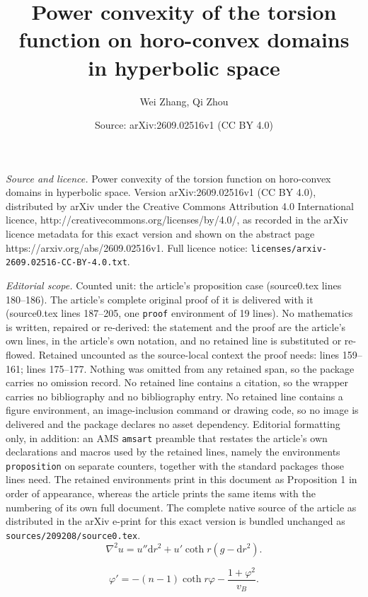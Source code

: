 \documentclass[10pt,a4paper]{amsart}
\title{Power convexity of the torsion function on horo-convex domains in hyperbolic space}
\author{Wei Zhang, Qi Zhou}
\date{Source: arXiv:2609.02516v1 (CC BY 4.0)}
\newcommand{\dd}{\mathrm{d}}
\begin{document}
\maketitle

\noindent\emph{Source and licence.} Power convexity of the torsion function on horo-convex domains in hyperbolic space. Version arXiv:2609.02516v1 (CC BY 4.0), distributed by arXiv under the Creative Commons Attribution 4.0 International licence, http://creativecommons.org/licenses/by/4.0/, as recorded in the arXiv licence metadata for this exact version and shown on the abstract page https://arxiv.org/abs/2609.02516v1. Full licence notice: \texttt{licenses/arxiv-2609.02516-CC-BY-4.0.txt}.\par\smallskip

\noindent\textit{Editorial scope.} Counted unit: the article's proposition case (source0.tex lines 180--186). The article's complete original proof of it is delivered with it (source0.tex lines 187--205, one \texttt{proof} environment of 19 lines). No mathematics is written, repaired or re-derived: the statement and the proof are the article's own lines, in the article's own notation, and no retained line is substituted or re-flowed.  Retained uncounted as the source-local context the proof needs: lines 159--161; lines 175--177.  Nothing was omitted from any retained span, so the package carries no omission record.  No retained line contains a citation, so the wrapper carries no bibliography and no bibliography entry.  No retained line contains a figure environment, an image-inclusion command or drawing code, so no image is delivered and the package declares no asset dependency.  Editorial formatting only, in addition: an AMS \texttt{amsart} preamble that restates the article's own declarations and macros used by the retained lines, namely the environments \texttt{proposition} on separate counters, together with the standard packages those lines need.  The retained environments print in this document as Proposition 1 in order of appearance, whereas the article prints the same items with the numbering of its own full document.  The complete native source of the article as distributed in the arXiv e-print for this exact version is bundled unchanged as \texttt{sources/209208/source0.tex}.
\begin{equation}\label{Equality-radial Hessian}
\nabla^2u=u''\dd r^2+u'\coth r(g-\dd r^2).
\end{equation}

\begin{equation}\label{Equation-torsion-radial}
\varphi'=-(n-1)\coth r\varphi-\frac{1+\varphi^2}{v_B}.
\end{equation}
\end{document}

